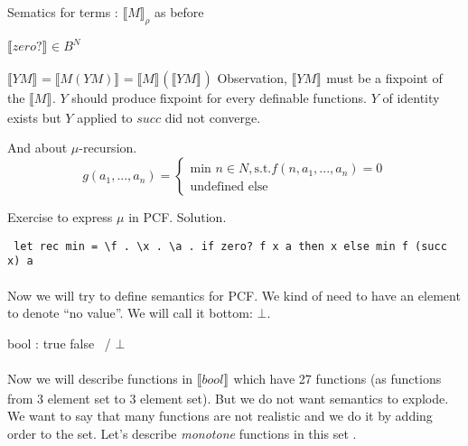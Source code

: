 \documentclass[a4paper,10pt]{book}
\newcommand{\sem}[2]{ \llbracket#1\rrbracket_{#2} }
\begin{document}
Sematics for terms : $\sem{M}{\rho} $ as before

$\sem{zero?}{} \in B^N$

$\sem{YM}{} = \sem{M(YM)}{} = \sem{M}{} (\sem{YM}{})$
Observation, $\sem{YM}{}$ must be a fixpoint of the $\sem{M}{}$. $Y$ should produce fixpoint for every 
definable functions. $Y$ of identity exists but $Y$ applied to $succ$ did not converge.


And about $\mu$-recursion.
 \[
    g(a_1,...,a_n)=\left\{
                \begin{array}{ll}
                  \text{min } n\in N, \text{s.t.} f(n,a_1,...,a_n)=0\\
                  \text{undefined else}
                \end{array}
              \right.
  \]
  
  
  

Exercise to express $\mu$ in PCF.
Solution.
\begin{verbatim}
 let rec min = \f . \x . \a . if zero? f x a then x else min f (succ x) a
\end{verbatim}

\paragraph{}
Now we will try to define semantics for PCF.
We kind of need to have an element to denote ``no value''. We will call it bottom: $\bot$.

bool :   true  false
           \    /
            $\bot$
            
\paragraph{}
Now we will describe functions in $\sem{bool}{}$ which have 27 functions (as functions from 3
element set to 3 element set). But we do not want semantics to explode. We want to say that 
many functions are not realistic and we do it by adding order to the set. Let's describe 
\textit{monotone} functions in this set .

\end{document}
